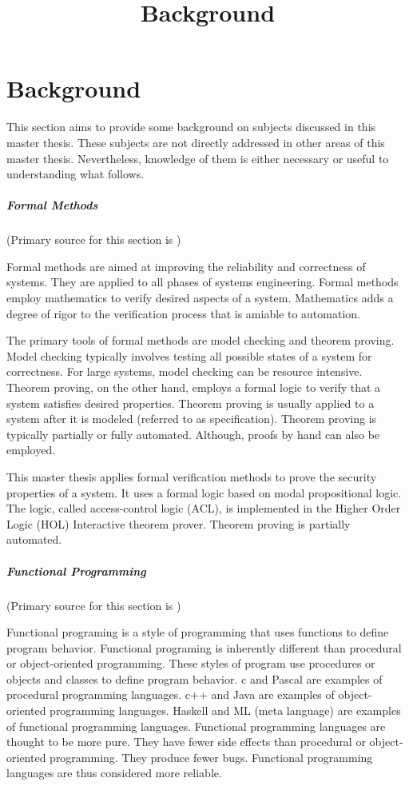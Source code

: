 \documentclass[../../main/main.tex]{subfiles}
\begin{document}
\title{Background}

\chapter{Background}
This section aims to provide some background on subjects discussed in this master thesis.  These subjects are not directly addressed in other areas of this master thesis.  Nevertheless, knowledge of them is either necessary or useful to understanding what follows.

\paragraph*{Formal Methods}
(Primary source for this section is \cite{wikiformalmethods})

Formal methods are aimed at improving the reliability and correctness of systems\cite{formalmethodslcarke}.  They are applied to all phases of systems engineering.  Formal methods employ mathematics to verify desired aspects of a system.  Mathematics adds a degree of rigor to the verification process that is amiable to automation.  

The primary tools of formal methods are model checking and theorem proving.  Model checking typically involves testing all possible states of a system for correctness. For large systems, model checking can be resource intensive.  Theorem proving, on the other hand, employs a formal logic to verify that a system satisfies desired properties.  Theorem proving is usually applied to a system after it is modeled (referred to as specification).   Theorem proving is typically partially or fully automated.  Although, proofs by hand can also be employed. 

This master thesis applies formal verification methods to prove the security properties of a system. It uses a formal logic based on modal propositional logic.  The logic, called access-control logic (ACL), is implemented in the Higher Order Logic (HOL) Interactive theorem prover.  Theorem proving is partially automated. 

\paragraph*{Functional Programming}
(Primary source for this section is \cite{functionalprogramming})

Functional programing is a style of programming that uses functions to define program behavior.  Functional programing is inherently different than procedural or object-oriented programming. These styles of program use procedures or objects and classes to define program behavior.  c  and Pascal are examples of procedural programming languages.  c++ and Java are examples of object-oriented programming languages.  Haskell and ML (meta language) are examples of functional programming languages.  Functional programming languages are thought to be more pure.  They have fewer side effects than procedural or object-oriented programming.  They produce fewer bugs.  Functional programming languages are thus considered more reliable.    
\end{document}
